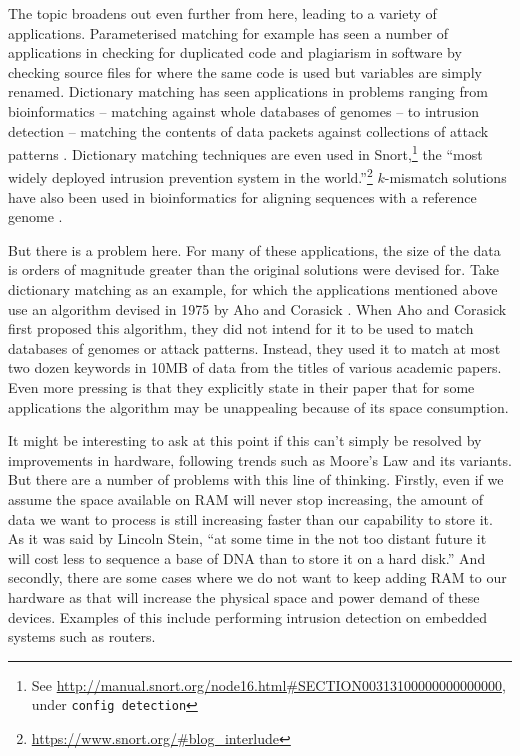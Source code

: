 \documentclass[a4paper,11pt]{article}
\begin{document}
    The topic broadens out even further from here, leading to a variety of applications. Parameterised matching for example has seen a number of applications in checking for duplicated code \cite{Baker:1993:TPP:167088.167115} and plagiarism in software \cite{Pandey:plagiarism} by checking source files for where the same code is used but variables are simply renamed. Dictionary matching has seen applications in problems ranging from bioinformatics -- matching against whole databases of genomes \cite{15713233} -- to intrusion detection -- matching the contents of data packets against collections of attack patterns \cite{1354682}. Dictionary matching techniques are even used in Snort,\footnote{See \url{http://manual.snort.org/node16.html\#SECTION00313100000000000000}, under \texttt{config detection}} the ``most widely deployed intrusion prevention system in the world.''\footnote{\url{https://www.snort.org/\#blog_interlude}} $k$-mismatch solutions have also been used in bioinformatics for aligning sequences with a reference genome \cite{Tennakoon10062012}.

    But there is a problem here. For many of these applications, the size of the data is orders of magnitude greater than the original solutions were devised for. Take dictionary matching as an example, for which the applications mentioned above use an algorithm devised in 1975 by Aho and Corasick \cite{Aho:1975:ESM:360825.360855}. When Aho and Corasick first proposed this algorithm, they did not intend for it to be used to match databases of genomes or attack patterns. Instead, they used it to match at most two dozen keywords in 10MB of data from the titles of various academic papers. Even more pressing is that they explicitly state in their paper that for some applications the algorithm may be unappealing because of its space consumption.

    It might be interesting to ask at this point if this can't simply be resolved by improvements in hardware, following trends such as Moore's Law \cite{658762} and its variants. But there are a number of problems with this line of thinking. Firstly, even if we assume the space available on RAM will never stop increasing, the amount of data we want to process is still increasing faster than our capability to store it. As it was said by Lincoln Stein, ``at some time in the not too distant future it will cost less to sequence a base of DNA than to store it on a hard disk.'' \cite{20441614} And secondly, there are some cases where we do not want to keep adding RAM to our hardware as that will increase the physical space and power demand of these devices. Examples of this include performing intrusion detection on embedded systems such as routers.
\end{document}
